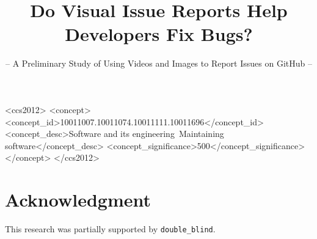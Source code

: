 \documentclass[sigconf]{acmart}
\begin{document}
\title{Do Visual Issue Reports Help Developers Fix Bugs?}
\subtitle{-- A Preliminary Study of Using Videos and Images to Report Issues on GitHub --}


\newcommand{\RQone}{Do the visual issue reports receive more/faster responses than non-visual issue reports?}
\newcommand{\RQtwo}{Do the visual issue reports get resolved faster than non-visual issue reports?}

\def\summarybox#1#2{
\medskip
\begin{tcolorbox}[enhanced,title=#1, attach boxed title to top left= {xshift=0mm, yshift*=-\tcboxedtitleheight/2}]
    #2
\end{tcolorbox}
}


\begin{CCSXML}
<ccs2012>
<concept>
<concept_id>10011007.10011074.10011111.10011696</concept_id>
<concept_desc>Software and its engineering~Maintaining software</concept_desc>
<concept_significance>500</concept_significance>
</concept>
</ccs2012>
\end{CCSXML}





\maketitle



% 



% 



\section*{Acknowledgment}
This research was partially supported by \texttt{double\_blind}.




\end{document}
